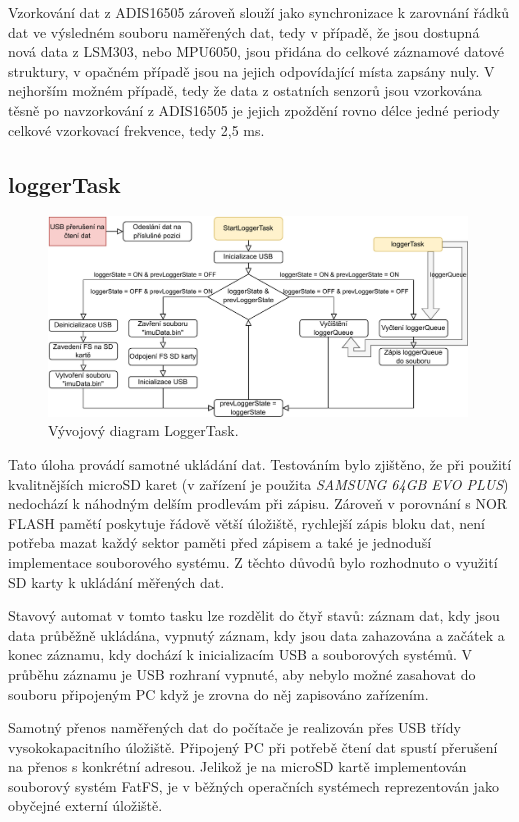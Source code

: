 Vzorkování dat z ADIS16505 zároveň slouží jako synchronizace k zarovnání řádků dat ve výsledném souboru naměřených dat, tedy v případě, že jsou dostupná nová data z LSM303, nebo MPU6050, jsou přidána do celkové záznamové datové struktury, v opačném případě jsou na jejich odpovídající místa zapsány nuly. V nejhorším možném případě, tedy že data z ostatních senzorů jsou vzorkována těsně po navzorkování z ADIS16505 je jejich zpoždění rovno délce jedné periody celkové vzorkovací frekvence, tedy 2,5 ms.

\subsection{loggerTask} \label{loggerTask}
\begin{figure}[h]
    \centering
    \includegraphics[width=0.99\textwidth]{obrazky/LoggerTask}
    \caption{Vývojový diagram LoggerTask.}
\end{figure}
Tato úloha provádí samotné ukládání dat. Testováním bylo zjištěno, že při použití kvalitnějších microSD karet (v zařízení je použita \emph{SAMSUNG 64GB EVO PLUS}) nedochází k náhodným delším prodlevám při zápisu. Zároveň v porovnání s NOR FLASH pamětí poskytuje řádově větší úložiště, rychlejší zápis bloku dat, není potřeba mazat každý sektor paměti před zápisem a také je jednoduší implementace souborového systému. Z těchto důvodů bylo rozhodnuto o využití SD karty k ukládání měřených dat.

Stavový automat v tomto tasku lze rozdělit do čtyř stavů: záznam dat, kdy jsou data průběžně ukládána, vypnutý záznam, kdy jsou data zahazována a začátek a konec záznamu, kdy dochází k inicializacím USB a souborových systémů. V průběhu záznamu je USB rozhraní vypnuté, aby nebylo možné zasahovat do souboru připojeným PC když je zrovna do něj zapisováno zařízením.

Samotný přenos naměřených dat do počítače je realizován přes USB třídy vysokokapacitního úložiště. Připojený PC při potřebě čtení dat spustí přerušení na přenos s konkrétní adresou. Jelikož je na microSD kartě implementován souborový systém FatFS, je v běžných operačních systémech reprezentován jako obyčejné externí úložiště.

